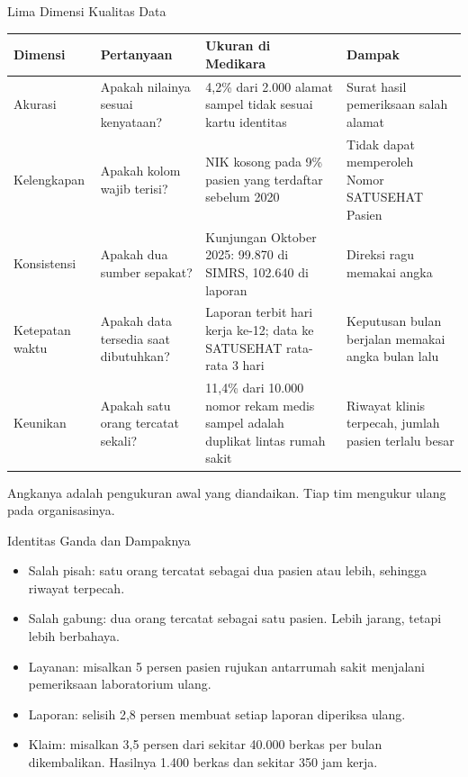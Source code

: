 \documentclass[aspectratio=169, table, 12pt]{beamer}
\begin{document}
\begin{frame}{{\Large Lima Dimensi Kualitas Data}}
  \scriptsize
  \begin{tabularx}{\textwidth}{lXXX}
    \hline
    \textbf{Dimensi} & \textbf{Pertanyaan} & \textbf{Ukuran di Medikara} & \textbf{Dampak} \\
    \hline
    Akurasi & Apakah nilainya sesuai kenyataan? & 4,2\% dari 2.000 alamat
      sampel tidak sesuai kartu identitas & Surat hasil pemeriksaan salah
      alamat \\
    \hline
    Kelengkapan & Apakah kolom wajib terisi? & NIK kosong pada 9\% pasien yang
      terdaftar sebelum 2020 & Tidak dapat memperoleh Nomor SATUSEHAT Pasien \\
    \hline
    Konsistensi & Apakah dua sumber sepakat? & Kunjungan Oktober 2025: 99.870
      di SIMRS, 102.640 di laporan & Direksi ragu memakai angka \\
    \hline
    Ketepatan waktu & Apakah data tersedia saat dibutuhkan? & Laporan terbit
      hari kerja ke-12; data ke SATUSEHAT rata-rata 3 hari & Keputusan bulan
      berjalan memakai angka bulan lalu \\
    \hline
    Keunikan & Apakah satu orang tercatat sekali? & 11,4\% dari 10.000 nomor
      rekam medis sampel adalah duplikat lintas rumah sakit & Riwayat klinis
      terpecah, jumlah pasien terlalu besar \\
    \hline
  \end{tabularx}

  \vspace{6pt}
  \small Angkanya adalah pengukuran awal yang diandaikan. Tiap tim mengukur ulang pada organisasinya.
\end{frame}

\begin{frame}{{\Large Identitas Ganda dan Dampaknya}}
  \vspace{6pt}
  \small
  \begin{itemize}
    \item Salah pisah: satu orang tercatat sebagai dua pasien atau lebih, sehingga riwayat terpecah.
    \item Salah gabung: dua orang tercatat sebagai satu pasien. Lebih jarang, tetapi lebih berbahaya.
    \item Layanan: misalkan 5 persen pasien rujukan antarrumah sakit menjalani pemeriksaan laboratorium
          ulang.
    \item Laporan: selisih 2,8 persen membuat setiap laporan diperiksa ulang.
    \item Klaim: misalkan 3,5 persen dari sekitar 40.000 berkas per bulan dikembalikan. Hasilnya 1.400
          berkas dan sekitar 350 jam kerja.
  \end{itemize}
\end{frame}
\end{document}
